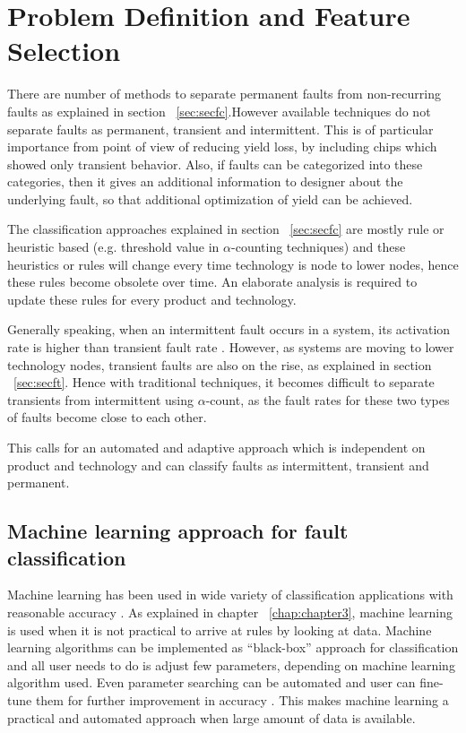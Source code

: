 \chapter{Problem Definition and Feature Selection}
\label{chap:chapter4}
There are number of methods to separate permanent faults from non-recurring faults as explained in section ~\ref{sec:secfc}.However available techniques do not separate faults as permanent, transient and intermittent. This is of particular importance from point of view of reducing yield loss, by including chips which showed only transient behavior. Also, if faults can be categorized into these categories, then it gives an additional information to designer about the underlying fault, so that additional optimization of yield can be achieved. 

The classification approaches explained in section ~\ref{sec:secfc} are mostly rule or heuristic based (e.g. threshold value in $\alpha$-counting techniques) and these heuristics or rules will change every time technology is node to lower nodes, hence these rules become obsolete over time. An elaborate analysis is required to update these rules for every product and technology.

Generally speaking, when an intermittent fault occurs in a system, its activation rate is higher than transient fault rate \cite{Bondavalli2000}. However, as systems are moving to lower technology nodes, transient faults are also on the rise, as explained in section ~\ref{sec:secft}. Hence with traditional techniques, it becomes difficult to separate transients from intermittent using $\alpha$-count, as the fault rates for these two types of faults become close to each other.

This calls for an automated and adaptive approach which is independent on product and technology and can classify faults as intermittent, transient and permanent. 

\section{Machine learning approach for fault classification}

Machine learning has been used in wide variety of classification applications with reasonable accuracy \cite{Pang2002,Nguyen2008,Sebastiani2002, Kotsiantis2007}. As explained in chapter ~\ref{chap:chapter3}, machine learning is used when it is not practical to arrive at rules by looking at data. Machine learning algorithms can be implemented as \enquote{black-box} approach for classification and all user needs to do is adjust few parameters, depending on machine learning algorithm used. Even parameter searching can be automated and user can fine-tune them for further improvement in accuracy \cite{Hsu2003, Castillo2000}. This makes machine learning a practical and automated approach when large amount of data is available.

